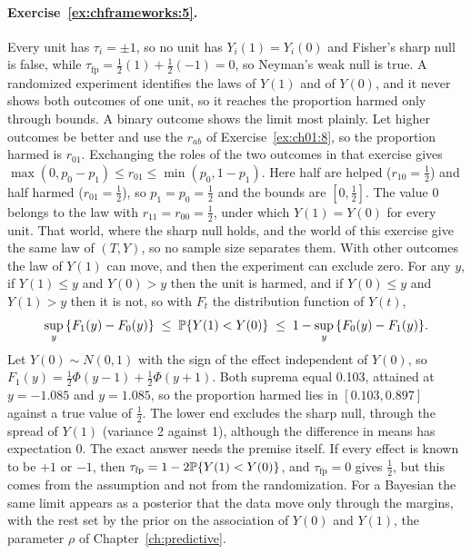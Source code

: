 \paragraph{Exercise~\ref{ex:chframeworks:5}.} Every unit has $\tau_i = \pm 1$, so no unit has $Y_i(1) = Y_i(0)$ and Fisher's sharp null is false, while $\tau_{\mathrm{fp}} = \frac{1}{2}(1) + \frac{1}{2}(-1) = 0$, so Neyman's weak null is true. A randomized experiment identifies the laws of $Y(1)$ and of $Y(0)$, and it never shows both outcomes of one unit, so it reaches the proportion harmed only through bounds. A binary outcome shows the limit most plainly. Let higher outcomes be better and use the $r_{ab}$ of Exercise~\ref{ex:ch01:8}, so the proportion harmed is $r_{01}$. Exchanging the roles of the two outcomes in that exercise gives $\max(0, p_0 - p_1) \le r_{01} \le \min(p_0, 1 - p_1)$. Here half are helped ($r_{10} = \frac{1}{2}$) and half harmed ($r_{01} = \frac{1}{2}$), so $p_1 = p_0 = \frac{1}{2}$ and the bounds are $[0, \frac{1}{2}]$. The value 0 belongs to the law with $r_{11} = r_{00} = \frac{1}{2}$, under which $Y(1) = Y(0)$ for every unit. That world, where the sharp null holds, and the world of this exercise give the same law of $(T, Y)$, so no sample size separates them. With other outcomes the law of $Y(1)$ can move, and then the experiment can exclude zero. For any $y$, if $Y(1) \le y$ and $Y(0) > y$ then the unit is harmed, and if $Y(0) \le y$ and $Y(1) > y$ then it is not, so with $F_t$ the distribution function of $Y(t)$,
\[
\sup_y\,\{F_1(y) - F_0(y)\} \;\le\; \mathbb{P}\{Y(1) < Y(0)\} \;\le\; 1 - \sup_y\,\{F_0(y) - F_1(y)\}.
\]
Let $Y(0) \sim N(0, 1)$ with the sign of the effect independent of $Y(0)$, so $F_1(y) = \frac{1}{2}\Phi(y - 1) + \frac{1}{2}\Phi(y + 1)$. Both suprema equal 0.103, attained at $y = -1.085$ and $y = 1.085$, so the proportion harmed lies in $[0.103, 0.897]$ against a true value of $\frac{1}{2}$. The lower end excludes the sharp null, through the spread of $Y(1)$ (variance 2 against 1), although the difference in means has expectation 0. The exact answer needs the premise itself. If every effect is known to be $+1$ or $-1$, then $\tau_{\mathrm{fp}} = 1 - 2\mathbb{P}\{Y(1) < Y(0)\}$, and $\tau_{\mathrm{fp}} = 0$ gives $\frac{1}{2}$, but this comes from the assumption and not from the randomization. For a Bayesian the same limit appears as a posterior that the data move only through the margins, with the rest set by the prior on the association of $Y(0)$ and $Y(1)$, the parameter $\rho$ of Chapter~\ref{ch:predictive}.


